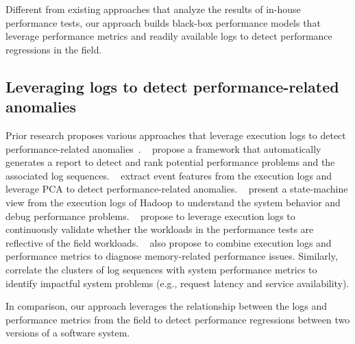 Different from existing approaches that analyze the results of in-house performance tests, our approach builds black-box performance models that leverage performance metrics and readily available logs to detect performance regressions in the field.

\subsection{Leveraging logs to detect performance-related anomalies}

Prior research proposes various approaches that leverage execution logs to detect performance-related anomalies~\citep{DBLP:journals/tse/JiangH15,DBLP:conf/sosp/XuHFPJ09,DBLP:conf/icdcs/TanKGN10,DBLP:conf/sigsoft/HeLLZLZ18}. 
~\citet{DBLP:conf/icsm/JiangHHF09} propose a framework that automatically generates a report to detect and rank potential performance problems and the associated log sequences. 
~\citet{DBLP:conf/sosp/XuHFPJ09} extract event features from the execution logs and leverage PCA to detect performance-related anomalies. 
~\citet{DBLP:conf/icdcs/TanKGN10} present a state-machine view from the execution logs of Hadoop to understand the system behavior and debug performance problems. 
~\citet{DBLP:journals/ase/SyerSJH17} propose to leverage execution logs to continuously validate whether the workloads in the performance tests are reflective of the field workloads. 
~\citet{DBLP:conf/icsm/SyerJNHNF13} also propose to combine execution logs and performance metrics to diagnose memory-related performance issues. 
Similarly,~\citet{DBLP:conf/sigsoft/HeLLZLZ18} correlate the clusters of log sequences with system performance metrics to identify impactful system problems (e.g., request latency and service availability).

In comparison, our approach leverages the relationship between the logs and performance metrics from the field to detect performance regressions between two versions of a software system.

